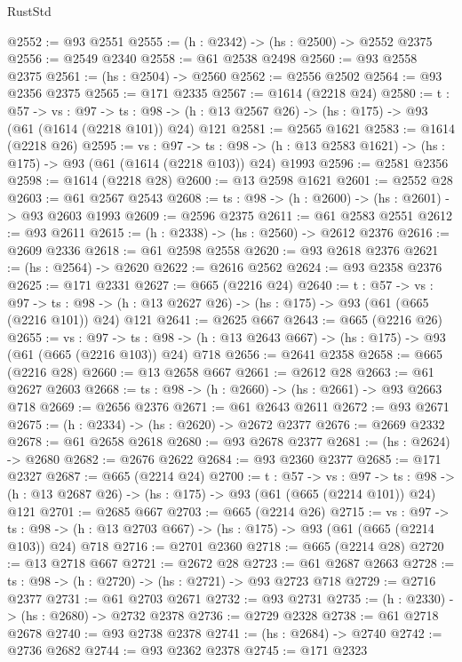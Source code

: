 \begin{lexlean}{RustStd}
\begin{coremodule}
@2552 := @93 @2551
@2555 := (h : @2342) -> (hs : @2500) -> @2552 @2375
@2556 := @2549 @2340
@2558 := @61 @2538 @2498
@2560 := @93 @2558 @2375
@2561 := (hs : @2504) -> @2560
@2562 := @2556 @2502
@2564 := @93 @2356 @2375
@2565 := @171 @2335
@2567 := @1614 (@2218 @24)
@2580 := {t : @57} ->
  {vs : @97} ->
  {ts : @98} -> (h : @13 @2567 @26) -> (hs : @175) -> @93 (@61 (@1614 (@2218 @101)) @24) @121
@2581 := @2565 @1621
@2583 := @1614 (@2218 @26)
@2595 := {vs : @97} ->
  {ts : @98} -> (h : @13 @2583 @1621) -> (hs : @175) -> @93 (@61 (@1614 (@2218 @103)) @24) @1993
@2596 := @2581 @2356
@2598 := @1614 (@2218 @28)
@2600 := @13 @2598 @1621
@2601 := @2552 @28
@2603 := @61 @2567 @2543
@2608 := {ts : @98} -> (h : @2600) -> (hs : @2601) -> @93 @2603 @1993
@2609 := @2596 @2375
@2611 := @61 @2583 @2551
@2612 := @93 @2611
@2615 := (h : @2338) -> (hs : @2560) -> @2612 @2376
@2616 := @2609 @2336
@2618 := @61 @2598 @2558
@2620 := @93 @2618 @2376
@2621 := (hs : @2564) -> @2620
@2622 := @2616 @2562
@2624 := @93 @2358 @2376
@2625 := @171 @2331
@2627 := @665 (@2216 @24)
@2640 := {t : @57} ->
  {vs : @97} ->
  {ts : @98} -> (h : @13 @2627 @26) -> (hs : @175) -> @93 (@61 (@665 (@2216 @101)) @24) @121
@2641 := @2625 @667
@2643 := @665 (@2216 @26)
@2655 := {vs : @97} ->
  {ts : @98} -> (h : @13 @2643 @667) -> (hs : @175) -> @93 (@61 (@665 (@2216 @103)) @24) @718
@2656 := @2641 @2358
@2658 := @665 (@2216 @28)
@2660 := @13 @2658 @667
@2661 := @2612 @28
@2663 := @61 @2627 @2603
@2668 := {ts : @98} -> (h : @2660) -> (hs : @2661) -> @93 @2663 @718
@2669 := @2656 @2376
@2671 := @61 @2643 @2611
@2672 := @93 @2671
@2675 := (h : @2334) -> (hs : @2620) -> @2672 @2377
@2676 := @2669 @2332
@2678 := @61 @2658 @2618
@2680 := @93 @2678 @2377
@2681 := (hs : @2624) -> @2680
@2682 := @2676 @2622
@2684 := @93 @2360 @2377
@2685 := @171 @2327
@2687 := @665 (@2214 @24)
@2700 := {t : @57} ->
  {vs : @97} ->
  {ts : @98} -> (h : @13 @2687 @26) -> (hs : @175) -> @93 (@61 (@665 (@2214 @101)) @24) @121
@2701 := @2685 @667
@2703 := @665 (@2214 @26)
@2715 := {vs : @97} ->
  {ts : @98} -> (h : @13 @2703 @667) -> (hs : @175) -> @93 (@61 (@665 (@2214 @103)) @24) @718
@2716 := @2701 @2360
@2718 := @665 (@2214 @28)
@2720 := @13 @2718 @667
@2721 := @2672 @28
@2723 := @61 @2687 @2663
@2728 := {ts : @98} -> (h : @2720) -> (hs : @2721) -> @93 @2723 @718
@2729 := @2716 @2377
@2731 := @61 @2703 @2671
@2732 := @93 @2731
@2735 := (h : @2330) -> (hs : @2680) -> @2732 @2378
@2736 := @2729 @2328
@2738 := @61 @2718 @2678
@2740 := @93 @2738 @2378
@2741 := (hs : @2684) -> @2740
@2742 := @2736 @2682
@2744 := @93 @2362 @2378
@2745 := @171 @2323

\end{coremodule}
\end{lexlean}

